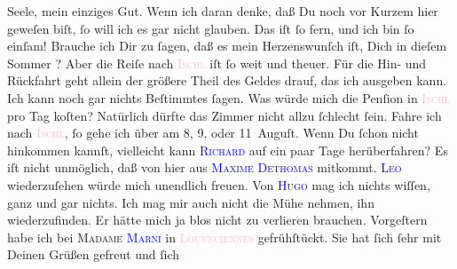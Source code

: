                Seele, mein einziges Gut.\pend
           \pstart
           {\pb}Wenn ich daran denke, daß Du noch vor Kurzem hier
               geweſen biſt, ſo will ich es gar nicht glauben. Das iſt ſo fern, und ich bin ſo
               einſam!\pend
           \pstart
           Brauche ich Dir zu ſagen, daß es mein Herzenswunſch iſt, Dich in dieſem Sommer
                  \label{K_L02816-2v}\label{K_L02816-2h}? Aber die Reiſe nach \textsc{\textcolor{pink}{Ischl}{}\ledrightnote{\textcolor{pink}{Bad Ischl}}} iſt ſo weit und theuer. Für die Hin- und Rückfahrt geht allein \strikeout{\textcolor{gray}{50 fl}} der größere Theil des Geldes
               drauf, das ich ausgeben  kann. Ich kann noch gar
               nichts Beſtimmtes ſagen. Was würde mich die Penſion in \textsc{\textcolor{pink}{Ischl}{}\ledrightnote{\textcolor{pink}{Bad Ischl}}} pro Tag koſten? Natürlich dürfte das Zimmer nicht allzu ſchlecht ſein.\pend
           \pstart
           Fahre ich nach \textsc{\textcolor{pink}{Ischl}{}\ledrightnote{\textcolor{pink}{Bad Ischl}}}, ſo gehe ich über \label{K_L02816-3v}\label{K_L02816-3h}{\pb}am 8, 9, oder 11 Auguſt. Wenn Du
               ſchon nicht hinkommen kannſt, vielleicht kann \textsc{\textcolor{blue}{Richard}{}\ledrightnote{\textcolor{blue}{Richard Beer-Hofmann}}} auf ein paar Tage herüberfahren? Es iſt nicht unmöglich, daß von hier aus \textsc{\textcolor{blue}{Maxime Dethomas}{}\ledrightnote{\textcolor{blue}{Maxime Dethomas}}} mitkommt. \textsc{\textcolor{blue}{Leo}{}\ledrightnote{\textcolor{blue}{Leo Van-Jung}}} wiederzuſehen würde mich unendlich freuen. Von \textsc{\textcolor{blue}{Hugo}{}\ledrightnote{\textcolor{blue}{Hugo von Hofmannsthal}}} mag ich nichts wiſſen, ganz und gar nichts. Ich mag mir auch nicht die Mühe
               nehmen, ihn wiederzufinden. Er hätte mich ja blos nicht zu verlieren brauchen.\pend
           \pstart
           Vorgeſtern habe ich bei \textsc{Madame
                     \textcolor{blue}{Marni}{}\ledrightnote{\textcolor{blue}{Jeanne Marni}}} in \textsc{\textcolor{pink}{Louveciennes}{}\ledrightnote{\textcolor{pink}{Louveciennes}}} gefrühſtückt. Sie hat ſich ſehr mit Deinen Grüßen gefreut und ſich
